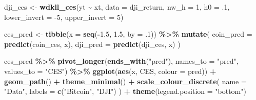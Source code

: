 \documentclass[
]{article}
\newenvironment{Shaded}{\begin{snugshade}}{\end{snugshade}}
\newcommand{\DataTypeTok}[1]{\textcolor[rgb]{0.13,0.29,0.53}{#1}}
\newcommand{\DecValTok}[1]{\textcolor[rgb]{0.00,0.00,0.81}{#1}}
\newcommand{\FloatTok}[1]{\textcolor[rgb]{0.00,0.00,0.81}{#1}}
\newcommand{\KeywordTok}[1]{\textcolor[rgb]{0.13,0.29,0.53}{\textbf{#1}}}
\newcommand{\NormalTok}[1]{#1}
\newcommand{\OperatorTok}[1]{\textcolor[rgb]{0.81,0.36,0.00}{\textbf{#1}}}
\newcommand{\StringTok}[1]{\textcolor[rgb]{0.31,0.60,0.02}{#1}}
\theoremstyle{definition}
\theoremstyle{definition}
\theoremstyle{definition}
\theoremstyle{remark}
\begin{document}
\begin{Shaded}
\begin{Highlighting}[]
\NormalTok{dji\_ces <{-}}\StringTok{ }\KeywordTok{wdkll\_ces}\NormalTok{(yt }\OperatorTok{\textasciitilde{}}\StringTok{ }\NormalTok{xt, }\DataTypeTok{data =}\NormalTok{ dji\_return, }\DataTypeTok{nw\_h =} \DecValTok{1}\NormalTok{, }\DataTypeTok{h0 =} \FloatTok{.1}\NormalTok{, }\DataTypeTok{lower\_invert =} \DecValTok{{-}5}\NormalTok{, }\DataTypeTok{upper\_invert =} \DecValTok{5}\NormalTok{)}
\end{Highlighting}
\end{Shaded}

\begin{Shaded}
\begin{Highlighting}[]
\NormalTok{ces\_pred <{-}}\StringTok{ }
\StringTok{  }\KeywordTok{tibble}\NormalTok{(}\DataTypeTok{x =} \KeywordTok{seq}\NormalTok{(}\OperatorTok{{-}}\FloatTok{1.5}\NormalTok{, }\FloatTok{1.5}\NormalTok{, }\DataTypeTok{by =} \FloatTok{.1}\NormalTok{)) }\OperatorTok{\%>\%}\StringTok{ }
\StringTok{  }\KeywordTok{mutate}\NormalTok{(}
    \DataTypeTok{coin\_pred =} \KeywordTok{predict}\NormalTok{(coin\_ces, x),}
    \DataTypeTok{dji\_pred =} \KeywordTok{predict}\NormalTok{(dji\_ces, x)}
\NormalTok{  )}
\end{Highlighting}
\end{Shaded}

\begin{Shaded}
\begin{Highlighting}[]
\NormalTok{ces\_pred }\OperatorTok{\%>\%}\StringTok{ }
\StringTok{  }\KeywordTok{pivot\_longer}\NormalTok{(}\KeywordTok{ends\_with}\NormalTok{(}\StringTok{"pred"}\NormalTok{), }\DataTypeTok{names\_to =} \StringTok{"pred"}\NormalTok{, }\DataTypeTok{values\_to =} \StringTok{"CES"}\NormalTok{) }\OperatorTok{\%>\%}\StringTok{ }
\StringTok{  }\KeywordTok{ggplot}\NormalTok{(}\KeywordTok{aes}\NormalTok{(x, CES, }\DataTypeTok{colour =}\NormalTok{ pred)) }\OperatorTok{+}
\StringTok{  }\KeywordTok{geom\_path}\NormalTok{() }\OperatorTok{+}
\StringTok{  }\KeywordTok{theme\_minimal}\NormalTok{() }\OperatorTok{+}
\StringTok{  }\KeywordTok{scale\_colour\_discrete}\NormalTok{(}
    \DataTypeTok{name =} \StringTok{"Data"}\NormalTok{,}
    \DataTypeTok{labels =} \KeywordTok{c}\NormalTok{(}\StringTok{"Bitcoin"}\NormalTok{, }\StringTok{"DJI"}\NormalTok{)}
\NormalTok{  ) }\OperatorTok{+}
\StringTok{  }\KeywordTok{theme}\NormalTok{(}\DataTypeTok{legend.position =} \StringTok{"bottom"}\NormalTok{)}
\end{Highlighting}
\end{Shaded}
\end{document}
